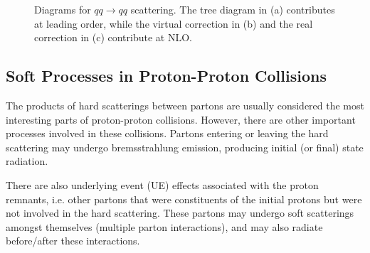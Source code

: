 \begin{figure}[tb]
\begin{center}
\caption[Diagrams for $qq \rightarrow qq$ scattering]{Diagrams for $qq \rightarrow qq$ scattering. The tree diagram in (a) contributes at leading order, while the virtual correction in (b) and the real correction in (c) contribute at NLO.}
\label{pqcd_LO_NLO}
\end{center}
\end{figure}


\subsection{Soft Processes in Proton-Proton Collisions}



The products of hard scatterings between partons are usually considered the most interesting parts of proton-proton collisions. However, there are other important processes involved in these collisions. Partons entering or leaving the hard scattering may undergo bremsstrahlung emission, producing initial (or final) state radiation. 

There are also underlying event (UE) effects associated with the proton remnants, i.e. other partons that were constituents of the initial protons but were not involved in the hard scattering. These partons may undergo soft scatterings amongst themselves (multiple parton interactions), and may also radiate before/after these interactions.

